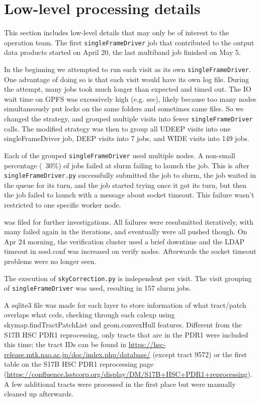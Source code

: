 \section{Low-level processing details}
This section includes low-level details that may only be of interest to the operation team.
The first \texttt{singleFrameDriver} job that contributed to the output data products started on April 20, the last multiband job finished on May 5.

In the beginning we attempted to run each visit as its own \texttt{singleFrameDriver}.
One advantage of doing so is that each visit would have its own log file.
During the attempt, many jobs took much longer than expected and timed out.
The IO wait time on GPFS was excessively high (e.g.  sec), likely because too many nodes simultaneously put locks on the same folders and sometimes same files.
So we changed the strategy, and grouped multiple visits into fewer \texttt{singleFrameDriver} calls.
The modified strategy was then to group all UDEEP visits into one singleFrameDriver job, DEEP visits into 7 jobs, and WIDE visits into 149 jobs.

Each of the grouped \texttt{singleFrameDriver} used multiple nodes.
A non-small percentage (~30\%) of jobs failed at slurm failing to launch the job.
This is after \texttt{singleFrameDriver.py} successfully submitted the job to slurm, the job waited in the queue for its turn, and the job started trying once it got its turn, but then the job failed to launch with a message about socket timeout.
This failure wasn't restricted to one specific worker node.
 
 was filed for further investigations.
All failures were resubmitted iteratively, with many failed again in the iterations, and eventually were all pushed though.
On Apr 24 morning, the verification cluster used a brief downtime and the LDAP timeout in sssd.conf was increased on verify nodes.
Afterwards the socket timeout problems were no longer seen.

The execution of \texttt{skyCorrection.py} is independent per visit.
The visit grouping of \texttt{singleFrameDriver} was used, resulting in 157 slurm jobs.

A sqlite3 file was made for each layer to store information of what tract/patch overlaps what ccds, checking through each calexp using skymap.findTractPatchList  and geom.convexHull features.
Different from the S17B HSC PDR1 reprocessing, only tracts that are in the PDR1 were included this time; the tract IDs can be found in \url{https://hsc-release.mtk.nao.ac.jp/doc/index.php/database/} (except tract 9572) or the first table on the S17B HSC PDR1 reprocessing page (\url{https://confluence.lsstcorp.org/display/DM/S17B+HSC+PDR1+reprocessing}).
A few additional tracts were processed in the first place but were manually cleaned up afterwards.

